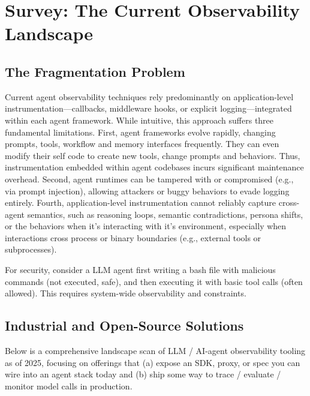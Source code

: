 \documentclass[sigplan,screen，review,9pt]{acmart}
\begin{document}
\section{Survey: The Current Observability Landscape}

\subsection{The Fragmentation Problem}

Current agent observability techniques rely predominantly on application-level instrumentation—callbacks, middleware hooks, or explicit logging—integrated within each agent framework. While intuitive, this approach suffers three fundamental limitations. First, agent frameworks evolve rapidly, changing prompts, tools, workflow and memory interfaces frequently. They can even modify their self code to create new tools, change prompts and behaviors. Thus, instrumentation embedded within agent codebases incurs significant maintenance overhead. Second, agent runtimes can be tampered with or compromised (e.g., via prompt injection), allowing attackers or buggy behaviors to evade logging entirely. Fourth, application-level instrumentation cannot reliably capture cross-agent semantics, such as reasoning loops, semantic contradictions, persona shifts, or the behaviors when it's interacting with it's environment, especially when interactions cross process or binary boundaries (e.g., external tools or subprocesses).

For security, consider a LLM agent first writing a bash file with malicious commands (not executed, safe), and then executing it with basic tool calls (often allowed). This requires system-wide observability and constraints.

\subsection{Industrial and Open-Source Solutions}

Below is a comprehensive landscape scan of LLM / AI-agent observability tooling as of 2025, focusing on offerings that (a) expose an SDK, proxy, or spec you can wire into an agent stack today and (b) ship some way to trace / evaluate / monitor model calls in production.
\end{document}
